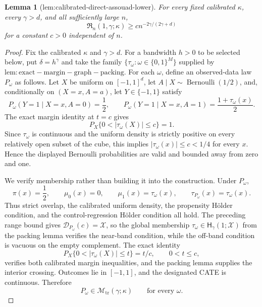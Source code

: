 \documentclass{article}
\newtheorem{lemma}{Lemma}
\begin{document}
\begin{lemma}[lem:calibrated-direct-assouad-lower]\label{lem:calibrated-direct-assouad-lower}
For every fixed calibrated \(\kappa\), every \(\gamma>d\), and all sufficiently large \(n\),
\[
 \mathfrak R_n(1,\gamma;\kappa)
 \ge c n^{-2\gamma/(2\gamma+d)}
\]
for a constant \(c>0\) independent of \(n\).
\end{lemma}
\begin{proof}
Fix the calibrated \(\kappa\) and \(\gamma>d\). For a bandwidth \(h>0\) to be selected below, put \(\delta=h^\gamma\) and take the family \(\{\tau_\omega:\omega\in\{0,1\}^M\}\) supplied by \(\mathrm{lem:exact-margin-graph-packing}\). For each \(\omega\), define an observed-data law \(P_\omega\) as follows. Let \(X\) be uniform on \([-1,1]^d\), let \(A\mid X\sim\operatorname{Bernoulli}(1/2)\), and, conditionally on \((X=x,A=a)\), let \(Y\in\{-1,1\}\) satisfy
\[
P_\omega(Y=1\mid X=x,A=0)=\frac12,
\qquad
P_\omega(Y=1\mid X=x,A=1)=\frac{1+\tau_\omega(x)}2.
\]
The exact margin identity at \(t=c\) gives
\[
P_X\{0<|\tau_\omega(X)|\le c\}=1.
\]
Since \(\tau_\omega\) is continuous and the uniform density is strictly positive on every relatively open subset of the cube, this implies \(|\tau_\omega(x)|\le c<1/4\) for every \(x\). Hence the displayed Bernoulli probabilities are valid and bounded away from zero and one.

We verify membership rather than building it into the construction. Under \(P_\omega\),
\[
\pi(x)=\frac12,\qquad \mu_0(x)=0,\qquad
\mu_1(x)=\tau_\omega(x),\qquad
\tau_{P_\omega}(x)=\tau_\omega(x).
\]
Thus strict overlap, the calibrated uniform density, the propensity Hölder condition, and the control-regression Hölder condition all hold. The preceding range bound gives \(\mathcal D_{P_\omega}(c)=\mathcal X\), so the global membership \(\tau_\omega\in\mathsf H_\gamma(1;\mathcal X)\) from the packing lemma verifies the near-band condition, while the off-band condition is vacuous on the empty complement. The exact identity
\[
P_X\{0<|\tau_\omega(X)|\le t\}=t/c,
\qquad 0<t\le c,
\]
verifies both calibrated margin inequalities, and the packing lemma supplies the interior crossing. Outcomes lie in \([-1,1]\), and the designated CATE is continuous. Therefore
\[
P_\omega\in\mathcal M_{\mathrm{tr}}(\gamma;\kappa)
\qquad\text{for every }\omega.
\]


\end{proof}
\end{document}
